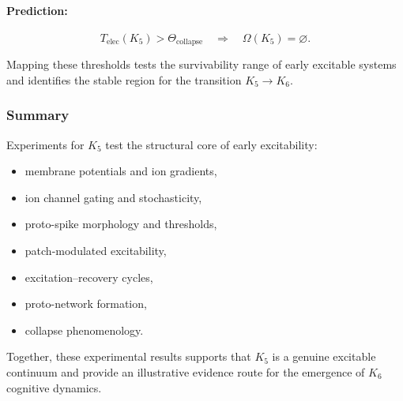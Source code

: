 \paragraph{Prediction:}

\[
   T_{\mathrm{elec}}(K_5) > \Theta_{\mathrm{collapse}}
   \quad \Rightarrow \quad
   \Omega(K_5) = \varnothing.
\]

Mapping these thresholds tests the survivability range
of early excitable systems and identifies the stable region
for the transition $K_5 \rightarrow K_6$.



\subsubsection{Summary}

Experiments for $K_5$ test the structural core of early excitability:

\begin{itemize}
    \item membrane potentials and ion gradients,
    \item ion channel gating and stochasticity,
    \item proto-spike morphology and thresholds,
    \item patch-modulated excitability,
    \item excitation--recovery cycles,
    \item proto-network formation,
    \item collapse phenomenology.
\end{itemize}

Together, these experimental results supports that $K_5$ is a
genuine excitable continuum and provide an illustrative evidence route for the emergence of $K_6$ cognitive dynamics.

